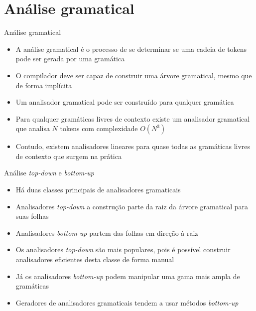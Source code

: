 \section{Análise gramatical}

\begin{frame}[fragile]{Análise gramatical}

    \begin{itemize}
        \item A análise gramatical é o processo de se determinar se uma cadeia de tokens pode ser gerada por uma gramática
        \pause

        \item O compilador deve ser capaz de construir uma árvore gramatical, mesmo que de forma implícita
        \pause

        \item Um analisador gramatical pode ser construído para qualquer gramática
        \pause

        \item Para qualquer gramáticas livres de contexto existe um analisador gramatical que analisa $N$ tokens com complexidade $O(N^3)$
        \pause

        \item Contudo, existem analisadores lineares para quase todas as gramáticas livres de contexto que surgem na prática
    \end{itemize}

\end{frame}

\begin{frame}[fragile]{Análise {\it top-down} e {\it bottom-up}}

    \begin{itemize}
        \item Há duas classes principais de analisadores gramaticais
        \pause

        \item Analisadores {\it top-down} a construção parte da raiz da árvore gramatical para suas folhas
        \pause

        \item Analisadores {\it bottom-up} partem das folhas em direção à raiz
        \pause

        \item Os analisadores \textit{top-down} são mais populares, pois é possível construir analisadores eficientes desta classe de forma manual
        \pause

        \item Já os analisadores \textit{bottom-up} podem manipular uma gama mais ampla de gramáticas
        \pause

        \item Geradores de analisadores gramaticais tendem a usar métodos \textit{bottom-up}
    \end{itemize}

\end{frame}

